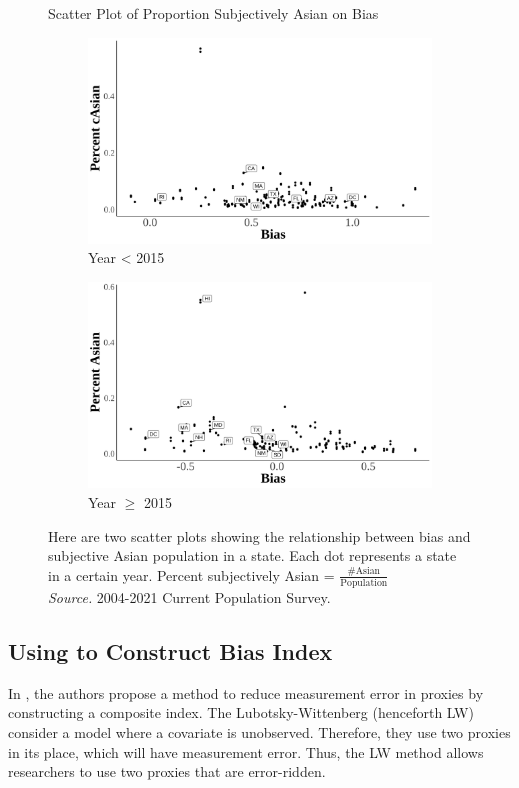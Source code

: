 \begin{figure}[H]
    \centering
    \caption{Scatter Plot of Proportion Subjectively Asian on Bias}
    \label{scatter-plot-1}
    \begin{subfigure}{.9\textwidth}
    \caption{Year < 2015}
    \centering
    \includegraphics[width=.9\linewidth]{scatter-plot-bias-Asian-less2015.png}
    \end{subfigure}
    \centering
    \begin{subfigure}{.9\textwidth}
    \caption{Year $\geq$ 2015}
    \centering
    \includegraphics[width=.9\linewidth]{scatter-plot-bias-Asian-great2015.png}
    \end{subfigure}
    \caption*{\footnotesize{Here are two scatter plots showing the relationship between bias and subjective Asian population in a state. Each dot represents a state in a certain year. Percent subjectively Asian = $\frac{\# \text{Asian}}{\text{Population}}$ \\
    \emph{Source.} 2004-2021 Current Population Survey.}}
    \end{figure}
    
\subsection*{Using \textcite{lubotskyInterpretationRegressionsMultiple2006} to Construct Bias Index} %
\label{sub:lw-bias}
In \textcite{lubotskyInterpretationRegressionsMultiple2006}, the authors propose a method to reduce measurement error in proxies by constructing a composite index. The Lubotsky-Wittenberg (henceforth LW) consider a model where a covariate is unobserved. Therefore, they use two proxies in its place, which will have measurement error. Thus, the LW method allows researchers to use two proxies that are error-ridden. 


